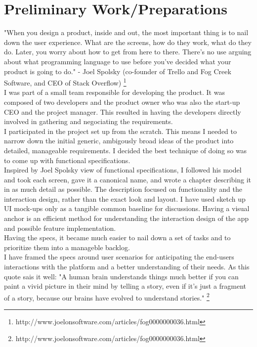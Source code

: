 \section{Preliminary Work/Preparations}

"When you design a product, inside and out, the most important thing is to nail down the user experience. What are the screens, how do they work, what do they do. Later, you worry about how to get from here to there. There's no use arguing about what programming language to use before you've decided what your product is going to do." - Joel Spolsky (co-founder of Trello and Fog Creek Software, and CEO of Stack Overflow) \footnote{http://www.joelonsoftware.com/articles/fog0000000036.html}\\

I was part of a small team responsible for developing the product. It was composed of two developers and the product owner who was also the start-up CEO and the project manager. This resulted in having the developers directly involved in gathering and negociating the requirements.\\

I participated in the project set up from the scratch. This means I needed to narrow down the initial generic, ambigously broad ideas of the product into detailed, manageable requirements. I decided the best technique of doing so was to come up with functional specifications.\\

Inspired by Joel Spolsky view of functional specifications, I followed his model and took each screen, gave it a canonical name, and wrote a chapter describing it in as much detail as possible. The description focused on functionality and the interaction design, rather than the exact look and layout. I have used sketch up UI mock-ups only as a tangible common baseline for discussions. Having a visual anchor is an efficient method for understanding the interaction design of the app and possible feature implementation.\\

Having the specs, it became much easier to nail down a set of tasks and to prioritize them into a manageble backlog.\\

I have framed the specs around user scenarios for anticipating the end-users interactions with the platform and a better understanding of their needs. As this quote sais it well: "A human brain understands things much better if you can paint a vivid picture in their mind by telling a story, even if it's just a fragment of a story, because our brains have evolved to understand stories." \footnote{http://www.joelonsoftware.com/articles/fog0000000036.html}









